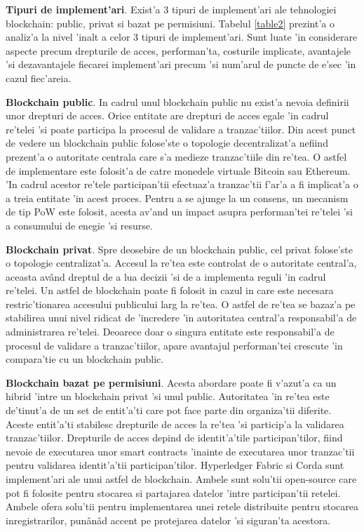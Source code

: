 \documentclass[12pt,a4paper,twoside]{report}
\begin{document}
	
	\textbf{Tipuri de implement'ari}. Exist'a 3 tipuri de implement'ari ale tehnologiei blockchain: public, privat si bazat pe permisiuni\cite{permiss}\cite{ppp}. Tabelul \ref{table2} prezint'a o analiz'a la nivel 'inalt a celor 3 tipuri de implement'ari. Sunt luate 'in considerare aspecte precum drepturile de acces, performan'ta, costurile implicate, avantajele 'si dezavantajele fiecarei implement'ari precum 'si num'arul de puncte de e'sec 'in cazul fiec'areia.
		
	\textbf{Blockchain public}. In cadrul unul blockchain public nu exist'a nevoia definirii unor  drepturi de acces. Orice entitate are drepturi de acces egale 'in cadrul re'telei 'si poate participa la procesul de validare a tranzac'tiilor. Din acest punct de vedere un blockchain public folose'ste o topologie decentralizat'a nefiind prezent'a o autoritate centrala care s'a medieze tranzac'tiile din re'tea. O astfel de implementare este folosit'a de catre monedele virtuale Bitcoin sau Ethereum. 'In cadrul acestor re'tele participan'tii efectuaz'a tranzac'tii f'ar'a a fi implicat'a o a treia entitate 'in acest proces. Pentru a se ajunge la un consens, un mecanism de tip PoW este folosit, acesta av'and un impact asupra performan'tei re'telei 'si a consumului de enegie 'si resurse\cite{energy-bit}.
	
	\textbf{Blockchain privat}. Spre deosebire de un blockchain public, cel privat folose'ste o topologie centralizat'a. Accesul la re'tea este controlat de o autoritate central'a, aceasta av\^and dreptul de a lua decizii 'si de a implementa reguli 'in cadrul re'telei. Un astfel de blockchain poate fi folosit in cazul in care este necesara restric'tionarea accesului publicului larg la re'tea. O astfel de re'tea se bazaz'a pe stabilirea unui nivel ridicat de 'incredere 'in autoritatea central'a responsabil'a de administrarea re'telei. Deoarece doar o singura entitate este responsabil'a de procesul de validare a tranzac'tiilor, apare avantajul performan'tei crescute 'in compara'tie cu un blockchain public.
	
	\textbf{Blockchain bazat pe permisiuni}. Acesta abordare poate fi v'azut'a ca un hibrid 'intre un blockchain privat 'si unul public. Autoritatea 'in re'tea este de'tinut'a de un set de entit'a'ti care pot face parte din organiza'tii diferite. Aceste entit'a'ti stabilesc drepturile de acces la re'tea 'si particip'a la validarea tranzac'tiilor. Drepturile de acces depind de identit'a'tile participan'tilor, fiind nevoie de executarea unor smart contracts 'inainte de executarea unor tranzac'tii pentru validarea identit'a'tii participan'tilor. Hyperledger Fabric\cite{hlfv} si Corda sunt implement'ari ale unui astfel de blockchain. Ambele sunt solu'tii open-source care pot fi folosite pentru stocarea si partajarea datelor 'intre participan'tii retelei. Ambele ofera solu'tii pentru implementarea unei retele distribuite pentru stocarea inregistrarilor, pun\^an\^ad accent pe protejarea datelor 'si siguran'ta acestora.
	
\end{document}
